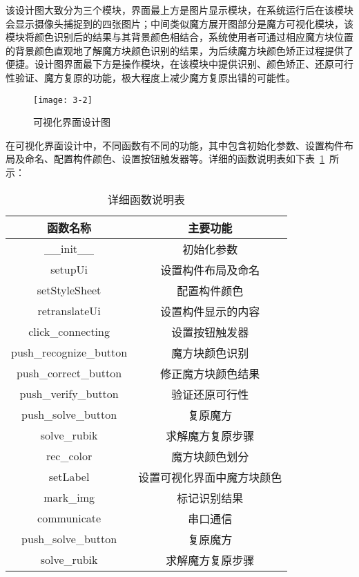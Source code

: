 该设计图大致分为三个模块，界面最上方是图片显示模块，在系统运行后在该模块会显示摄像头捕捉到的四张图片；中间类似魔方展开图部分是魔方可视化模块，该模块将颜色识别后的结果与其背景颜色相结合，系统使用者可通过相应魔方块位置的背景颜色直观地了解魔方块颜色识别的结果，为后续魔方块颜色矫正过程提供了便捷。设计图界面最下方是操作模块，在该模块中提供识别、颜色矫正、还原可行性验证、魔方复原的功能，极大程度上减少魔方复原出错的可能性。

\begin{figure}[H]
	\centering
	\texttt{[image: 3-2]}
	\caption{可视化界面设计图}\label{fig:3-2}
\end{figure}

在可视化界面设计中，不同函数有不同的功能，其中包含初始化参数、设置构件布局及命名、配置构件颜色、设置按钮触发器等。详细的函数说明表如下表~\ref{tab:3-2}~所示：

\begin{table}[H]
	\caption{详细函数说明表}\label{tab:3-2}
	\vspace{0.5em}
	\begin{center}
		{\wuhao
			\begin{tabular}{cc}
				\toprule
				函数名称 & 主要功能	\\
				\midrule
				\_\_init\_\_ & 初始化参数 \\
				setupUi & 设置构件布局及命名\\
				setStyleSheet & 配置构件颜色\\
				retranslateUi & 设置构件显示的内容\\
				click\_connecting & 设置按钮触发器\\
				push\_recognize\_button & 魔方块颜色识别\\
				push\_correct\_button & 修正魔方块颜色结果\\
				push\_verify\_button & 验证还原可行性\\
				push\_solve\_button & 复原魔方\\
				solve\_rubik & 求解魔方复原步骤\\
				rec\_color & 魔方块颜色划分\\
				setLabel & 设置可视化界面中魔方块颜色\\
				mark\_img & 标记识别结果\\
				communicate & 串口通信\\
				push\_solve\_button & 复原魔方\\
				solve\_rubik & 求解魔方复原步骤\\
				\bottomrule
		\end{tabular}}
	\end{center}
	\vspace{-1.5em}
\end{table}

